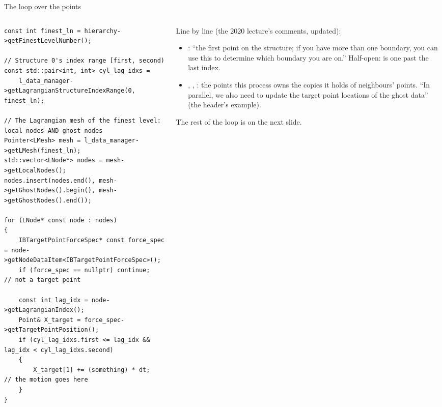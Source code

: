 \documentclass[aspectratio=169,11pt]{beamer}
\begin{document}
\begin{frame}[fragile]{The loop over the points}
\label{fr:loop}
\begin{columns}[T,onlytextwidth]
\begin{column}{0.54\textwidth}
\begin{lstlisting}[style=cpptiny]
const int finest_ln = hierarchy->getFinestLevelNumber();

// Structure 0's index range [first, second)
const std::pair<int, int> cyl_lag_idxs =
    l_data_manager->getLagrangianStructureIndexRange(0, finest_ln);

// The Lagrangian mesh of the finest level: local nodes AND ghost nodes
Pointer<LMesh> mesh = l_data_manager->getLMesh(finest_ln);
std::vector<LNode*> nodes = mesh->getLocalNodes();
nodes.insert(nodes.end(), mesh->getGhostNodes().begin(), mesh->getGhostNodes().end());

for (LNode* const node : nodes)
{
    IBTargetPointForceSpec* const force_spec = node->getNodeDataItem<IBTargetPointForceSpec>();
    if (force_spec == nullptr) continue;      // not a target point

    const int lag_idx = node->getLagrangianIndex();
    Point& X_target = force_spec->getTargetPointPosition();
    if (cyl_lag_idxs.first <= lag_idx && lag_idx < cyl_lag_idxs.second)
    {
        X_target[1] += (something) * dt;      // the motion goes here
    }
}
\end{lstlisting}
\end{column}
\begin{column}{0.44\textwidth}
\scriptsize Line by line (the 2020 lecture's comments, updated):
\begin{itemize}
  \item {}: ``the first point on the structure; if you have more than one boundary, you can use this to determine which boundary you are on.'' Half-open:  is one past the last index.
  \item {}, , : the points this process owns  the copies it holds of neighbours' points. ``In parallel, we also need to update the target point locations of the ghost data'' (the header's example).
\end{itemize}
\scriptsize The rest of the loop is on the next slide.
\end{column}
\end{columns}
\end{frame}
\end{document}
